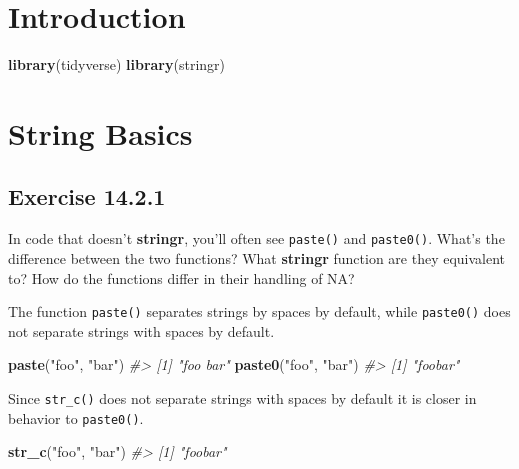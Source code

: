 \documentclass[]{book}
\newenvironment{Shaded}{\begin{snugshade}}{\end{snugshade}}
\newcommand{\CommentTok}[1]{\textcolor[rgb]{0.56,0.35,0.01}{\textit{#1}}}
\newcommand{\KeywordTok}[1]{\textcolor[rgb]{0.13,0.29,0.53}{\textbf{#1}}}
\newcommand{\NormalTok}[1]{#1}
\newcommand{\StringTok}[1]{\textcolor[rgb]{0.31,0.60,0.02}{#1}}
\theoremstyle{plain}
\theoremstyle{remark}
\theoremstyle{definition}
\theoremstyle{definition}
\theoremstyle{definition}
\theoremstyle{remark}
\begin{document}
\hypertarget{introduction-9}{%
\section{Introduction}\label{introduction-9}}

\begin{Shaded}
\begin{Highlighting}[]
\KeywordTok{library}\NormalTok{(tidyverse)}
\KeywordTok{library}\NormalTok{(stringr)}
\end{Highlighting}
\end{Shaded}

\hypertarget{string-basics}{%
\section{String Basics}\label{string-basics}}

\hypertarget{exercise-14.2.1}{%
\subsection*{\texorpdfstring{Exercise
{14.2.1}}{Exercise 14.2.1}}\label{exercise-14.2.1}}

In code that doesn't \textbf{stringr}, you'll often see \texttt{paste()}
and \texttt{paste0()}. What's the difference between the two functions?
What \textbf{stringr} function are they equivalent to? How do the
functions differ in their handling of NA?

The function \texttt{paste()} separates strings by spaces by default,
while \texttt{paste0()} does not separate strings with spaces by
default.

\begin{Shaded}
\begin{Highlighting}[]
\KeywordTok{paste}\NormalTok{(}\StringTok{"foo"}\NormalTok{, }\StringTok{"bar"}\NormalTok{)}
\CommentTok{#> [1] "foo bar"}
\KeywordTok{paste0}\NormalTok{(}\StringTok{"foo"}\NormalTok{, }\StringTok{"bar"}\NormalTok{)}
\CommentTok{#> [1] "foobar"}
\end{Highlighting}
\end{Shaded}

Since \texttt{str\_c()} does not separate strings with spaces by default
it is closer in behavior to \texttt{paste0()}.

\begin{Shaded}
\begin{Highlighting}[]
\KeywordTok{str_c}\NormalTok{(}\StringTok{"foo"}\NormalTok{, }\StringTok{"bar"}\NormalTok{)}
\CommentTok{#> [1] "foobar"}
\end{Highlighting}
\end{Shaded}
\end{document}
